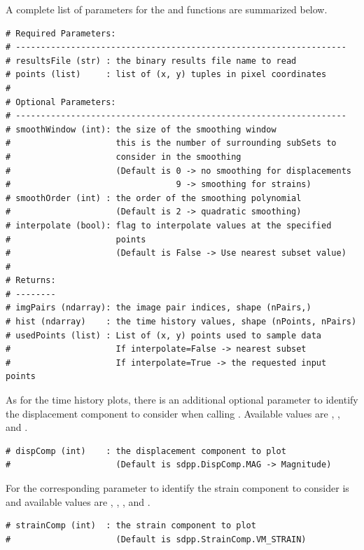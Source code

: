 A complete list of parameters for the   and  functions are summarized below.

\begin{lstlisting}
# Required Parameters:
# ------------------------------------------------------------------
# resultsFile (str) : the binary results file name to read
# points (list)     : list of (x, y) tuples in pixel coordinates
# 
# Optional Parameters:
# ------------------------------------------------------------------
# smoothWindow (int): the size of the smoothing window
#                     this is the number of surrounding subSets to 
#                     consider in the smoothing 
#                     (Default is 0 -> no smoothing for displacements
#                                 9 -> smoothing for strains)
# smoothOrder (int) : the order of the smoothing polynomial 
#                     (Default is 2 -> quadratic smoothing)
# interpolate (bool): flag to interpolate values at the specified 
#                     points
#                     (Default is False -> Use nearest subset value)
#
# Returns:
# --------
# imgPairs (ndarray): the image pair indices, shape (nPairs,)
# hist (ndarray)    : the time history values, shape (nPoints, nPairs)
# usedPoints (list) : List of (x, y) points used to sample data
#                     If interpolate=False -> nearest subset
#                     If interpolate=True -> the requested input points
\end{lstlisting}

As for the time history plots, there is an additional optional parameter  to identify the displacement component to consider when calling .  Available  values are , , and .

\begin{lstlisting}
# dispComp (int)    : the displacement component to plot
#                     (Default is sdpp.DispComp.MAG -> Magnitude)
\end{lstlisting}

For  the corresponding parameter to identify the strain component to consider is  and available  values are  , , , and .

\begin{lstlisting}
# strainComp (int)  : the strain component to plot
#                     (Default is sdpp.StrainComp.VM_STRAIN)
\end{lstlisting}